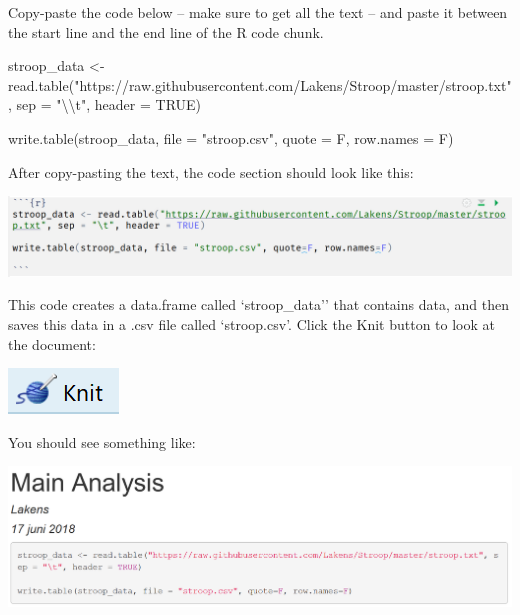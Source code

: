 \documentclass[
  oneside]{krantz}
\makeatletter
\newenvironment{Shaded}{\begin{snugshade}}{\end{snugshade}}
\newcommand{\AttributeTok}[1]{\textcolor[rgb]{0.61,0.61,0.61}{#1}}
\newcommand{\ConstantTok}[1]{\textcolor[rgb]{0,0,0}{#1}}
\newcommand{\FunctionTok}[1]{\textcolor[rgb]{0,0,0}{#1}}
\newcommand{\NormalTok}[1]{#1}
\newcommand{\OtherTok}[1]{\textcolor[rgb]{0.37,0.37,0.37}{#1}}
\newcommand{\SpecialCharTok}[1]{\textcolor[rgb]{0,0,0}{#1}}
\newcommand{\StringTok}[1]{\textcolor[rgb]{0.5,0.5,0.5}{#1}}
\newenvironment{kframe}{%
\medskip{}
\setlength{\fboxsep}{.8em}
 \def\at@end@of@kframe{}%
 \ifinner\ifhmode%
  \def\at@end@of@kframe{\end{minipage}}%
  \begin{minipage}{\columnwidth}%
 \fi\fi%
 \def\FrameCommand##1{\hskip\@totalleftmargin \hskip-\fboxsep
 \colorbox{shadecolor}{##1}\hskip-\fboxsep
     \hskip-\linewidth \hskip-\@totalleftmargin \hskip\columnwidth}%
 \MakeFramed {\advance\hsize-\width
   \@totalleftmargin\z@ \linewidth\hsize
   \@setminipage}}%
 {\par\unskip\endMakeFramed%
 \at@end@of@kframe}
\renewenvironment{Shaded}{\begin{kframe}}{\end{kframe}}
\makeatother
\begin{document}
Copy-paste the code below -- make sure to get all the text -- and paste it between
the start line and the end line of the R code chunk.

\begin{Shaded}
\begin{Highlighting}[]
\NormalTok{stroop\_data }\OtherTok{\textless{}{-}} \FunctionTok{read.table}\NormalTok{(}\StringTok{"https://raw.githubusercontent.com/Lakens/Stroop/master/stroop.txt"}\NormalTok{,}
\AttributeTok{sep =} \StringTok{"}\SpecialCharTok{\textbackslash{}\textbackslash{}}\StringTok{t"}\NormalTok{, }\AttributeTok{header =} \ConstantTok{TRUE}\NormalTok{)}\StringTok{\textasciigrave{}}

\AttributeTok{write.table(stroop\_data, file = "stroop.csv", quote = F, row.names = F)}
\end{Highlighting}
\end{Shaded}

After copy-pasting the text, the code section should look like this:

\begin{center}\includegraphics[width=1\linewidth]{images/6d87836ecdcc9b06891059acc43930a2} \end{center}

This code creates a data.frame called `stroop\_data'' that contains data, and then
saves this data in a .csv file called `stroop.csv'. Click the Knit button to look at the document:

\begin{center}\includegraphics[width=0.2\linewidth]{images/270645a5be86fa1d9d534f78b8ca0724} \end{center}

You should see something like:

\begin{center}\includegraphics[width=1\linewidth]{images/5bad7d8cde23291c2d67ff65897d60c4} \end{center}
\end{document}
